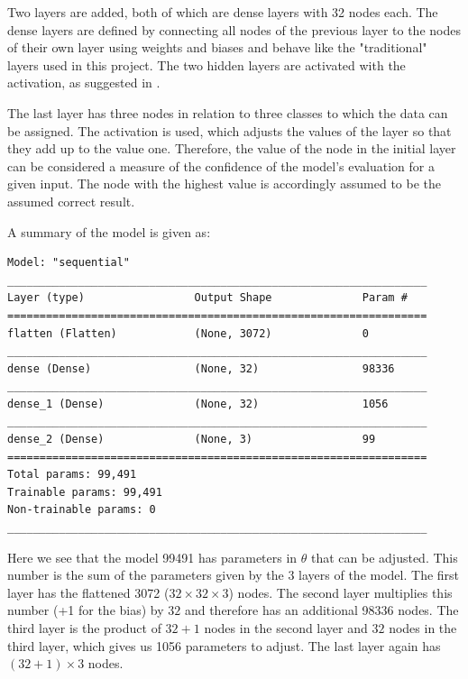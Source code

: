 Two layers are added, both of which are dense layers with 32 nodes each.
The dense layers are defined by connecting all nodes of the previous layer to the nodes of their own layer using weights and biases and behave like the "traditional" layers used in this project.
The two hidden layers are activated with the  activation, as suggested in \cite[p.168]{Goodfellow2017}.

The last layer has three nodes in relation to three classes to which the data can be assigned.
The activation  is used, which adjusts the values of the layer so that they add up to the value one.
Therefore, the value of the node in the initial layer can be considered a measure of the confidence of the model's evaluation for a given input.
The node with the highest value is accordingly assumed to be the assumed correct result.

A summary of the model is given as:

\begin{lstlisting}
Model: "sequential"
_________________________________________________________________
Layer (type)                 Output Shape              Param #   
=================================================================
flatten (Flatten)            (None, 3072)              0         
_________________________________________________________________
dense (Dense)                (None, 32)                98336     
_________________________________________________________________
dense_1 (Dense)              (None, 32)                1056      
_________________________________________________________________
dense_2 (Dense)              (None, 3)                 99        
=================================================================
Total params: 99,491
Trainable params: 99,491
Non-trainable params: 0
_________________________________________________________________
\end{lstlisting}

Here we see that the model 99491 has parameters in $\theta$ that can be adjusted.
This number is the sum of the parameters given by the 3 layers of the model.
The first layer has the flattened 3072 ($32 \times 32 \times 3$) nodes.
The second layer multiplies this number (+1 for the bias) by $32$ and therefore has an additional 98336 nodes.
The third layer is the product of $32 + 1$ nodes in the second layer and $32$ nodes in the third layer, which gives us 1056 parameters to adjust.
The last layer again has $(32 + 1) \times 3$ nodes.

